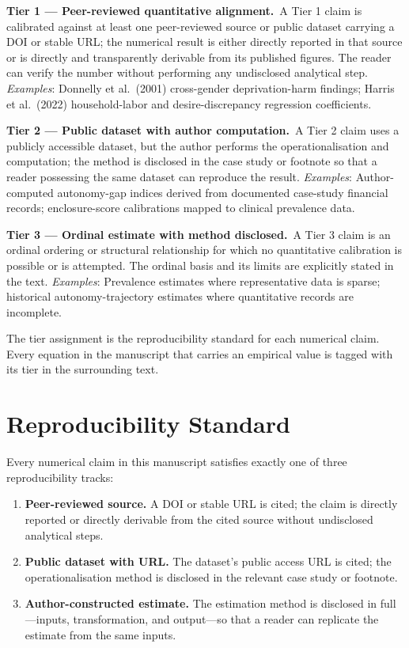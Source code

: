 \documentclass[12pt,openany]{book}
\numberwithin{equation}{chapter}
\begin{document}
\bigskip
\noindent\textbf{Tier 1 --- Peer-reviewed quantitative alignment.}\ A Tier 1 claim is calibrated against at least one peer-reviewed source or public dataset carrying a DOI or stable URL; the numerical result is either directly reported in that source or is directly and transparently derivable from its published figures. The reader can verify the number without performing any undisclosed analytical step. \textit{Examples}: Donnelly et al.\ (2001) cross-gender deprivation-harm findings; Harris et al.\ (2022) household-labor and desire-discrepancy regression coefficients.

\bigskip
\noindent\textbf{Tier 2 --- Public dataset with author computation.}\ A Tier 2 claim uses a publicly accessible dataset, but the author performs the operationalisation and computation; the method is disclosed in the case study or footnote so that a reader possessing the same dataset can reproduce the result. \textit{Examples}: Author-computed autonomy-gap indices derived from documented case-study financial records; enclosure-score calibrations mapped to clinical prevalence data.

\bigskip
\noindent\textbf{Tier 3 --- Ordinal estimate with method disclosed.}\ A Tier 3 claim is an ordinal ordering or structural relationship for which no quantitative calibration is possible or is attempted. The ordinal basis and its limits are explicitly stated in the text. \textit{Examples}: Prevalence estimates where representative data is sparse; historical autonomy-trajectory estimates where quantitative records are incomplete.

\bigskip
The tier assignment is the reproducibility standard for each numerical claim. Every equation in the manuscript that carries an empirical value is tagged with its tier in the surrounding text.

\section*{Reproducibility Standard}

Every numerical claim in this manuscript satisfies exactly one of three reproducibility tracks:

\begin{enumerate}
  \item \textbf{Peer-reviewed source.} A DOI or stable URL is cited; the claim is directly reported or directly derivable from the cited source without undisclosed analytical steps.

  \item \textbf{Public dataset with URL.} The dataset's public access URL is cited; the operationalisation method is disclosed in the relevant case study or footnote.

  \item \textbf{Author-constructed estimate.} The estimation method is disclosed in full---inputs, transformation, and output---so that a reader can replicate the estimate from the same inputs.
\end{enumerate}
\end{document}
